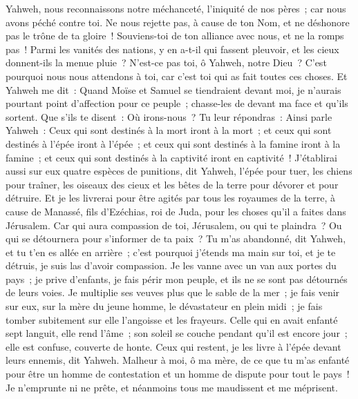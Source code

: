 \begin{multicols}{2}
Yahweh, nous reconnaissons notre méchanceté, l'iniquité de nos pères~; car nous avons péché contre toi.
Ne nous rejette pas, à cause de ton Nom, et ne déshonore pas le trône de ta gloire~! Souviens-toi de ton alliance avec nous, et ne la romps pas~!
Parmi les vanités des nations, y en a-t-il qui fassent pleuvoir, et les cieux donnent-ils la menue pluie~? N'est-ce pas toi, ô Yahweh, notre Dieu~? C'est pourquoi nous nous attendons à toi, car c'est toi qui as fait toutes ces choses.
\VerseOne{}Et Yahweh me dit~: Quand Moïse et Samuel se tiendraient devant moi, je n'aurais pourtant point d'affection pour ce peuple~; chasse-les de devant ma face et qu'ils sortent.
Que s'ils te disent~: Où irons-nous~? Tu leur répondras~: Ainsi parle Yahweh~: Ceux qui sont destinés à la mort iront à la mort~; et ceux qui sont destinés à l'épée iront à l'épée~; et ceux qui sont destinés à la famine iront à la famine~; et ceux qui sont destinés à la captivité iront en captivité~!
J'établirai aussi sur eux quatre espèces de punitions, dit Yahweh, l'épée pour tuer, les chiens pour traîner, les oiseaux des cieux et les bêtes de la terre pour dévorer et pour détruire. 
Et je les livrerai pour être agités par tous les royaumes de la terre, à cause de Manassé, fils d'Ezéchias, roi de Juda, pour les choses qu'il a faites dans Jérusalem. 
Car qui aura compassion de toi, Jérusalem, ou qui te plaindra~? Ou qui se détournera pour s'informer de ta paix~? 
Tu m'as abandonné, dit Yahweh, et tu t'en es allée en arrière~; c'est pourquoi j'étends ma main sur toi, et je te détruis, je suis las d'avoir compassion.
Je les vanne avec un van aux portes du pays~; je prive d'enfants, je fais périr mon peuple, et ils ne se sont pas détournés de leurs voies.
Je multiplie ses veuves plus que le sable de la mer~; je fais venir sur eux, sur la mère du jeune homme, le dévastateur en plein midi~; je fais tomber subitement sur elle l'angoisse et les frayeurs.
Celle qui en avait enfanté sept languit, elle rend l'âme~; son soleil se couche pendant qu'il est encore jour~; elle est confuse, couverte de honte. Ceux qui restent, je les livre à l'épée devant leurs ennemis, dit Yahweh.
Malheur à moi, ô ma mère, de ce que tu m'as enfanté pour être un homme de contestation et un homme de dispute pour tout le pays~! Je n'emprunte ni ne prête, et néanmoins tous me maudissent et me méprisent.

\end{multicols}
